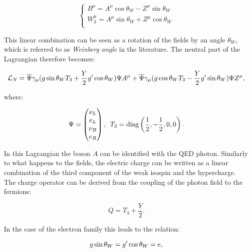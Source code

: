 \begin{equation}
\left\{\begin{matrix}
B^{\mu}=A^{\mu}\operatorname{cos}\theta_{W}-Z^{\mu}\operatorname{sin}\theta_{W}\\ 

W^{\mu}_3=A^{\mu}\operatorname{sin}\theta_{W}+Z^{\mu}\cos\theta_{W}\\ 
\end{matrix}\right.
\label{eq:su2_rotation}
\end{equation}

This linear combination can be seen as a rotation of the fields by an angle $\theta_W$, which is referred to as \emph{Weinberg angle} in the literature. 
The neutral part of the Lagrangian therefore becomes:
 
\begin{equation}
\l_{N}=\bar{\Psi}\gamma_{\mu}(g\operatorname{sin}\theta_{W}T_3+ \frac{Y}{2}g'\operatorname{cos}\theta_{W})\Psi A^{\mu}+\bar{\Psi}\gamma_{\mu}(g\operatorname{cos}\theta_{W}T_3- \frac{Y}{2}g'\operatorname{sin}\theta_{W})\Psi Z^{\mu},
\end{equation}

where:

\begin{equation}
\Psi = \begin{pmatrix}
\nu_L\\ 
e_L\\ 
\nu_R\\ 
e_R
\end{pmatrix}, \, \, \, T_3 = \rm{diag}\left(\frac{1}{2},-\frac{1}{2},0,0\right).
\end{equation}

In this Lagrangian the boson $A$ can be identified with the QED photon. Similarly to what happens to the fields, the electric charge can be written as a linear combination of the third component of the weak isospin and the hypercharge. The charge operator can be derived from the coupling of the photon field to the fermions: 

\begin{equation}
Q = T_3 + \dfrac{Y}{2}.
\end{equation}

In the case of the electron family this leads to the relation:

\begin{equation}
g \opname{sin}\theta_W = g' \opname{cos}\theta_W = e,
\end{equation}

